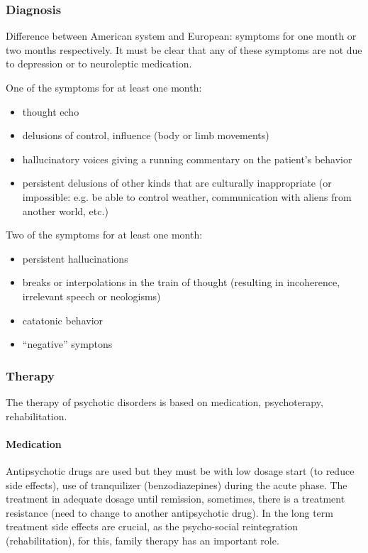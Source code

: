 \documentclass[12pt,article,oneside,a4paper]{memoir}
\begin{document}
\subsubsection{Diagnosis}
Difference between American system and European: symptoms for one month or two
months respectively. It must be clear that any of these symptoms are not due to
depression or to neuroleptic medication.

One of the symptoms for at least one month:
\begin{itemize}
\item thought echo
\item delusions of control, influence (body or limb movements)
\item hallucinatory voices giving a running commentary on the patient's
behavior
\item persistent delusions of other kinds that are culturally inappropriate
(or impossible: e.g. be able to control weather, communication with aliens
from  another world, etc.)
\end{itemize}

Two of the symptoms for at least one month:
\begin{itemize}
\item persistent hallucinations
\item breaks or interpolations in the train of thought (resulting in
incoherence, irrelevant speech or neologisms)
\item catatonic behavior
\item ``negative'' symptons
\end{itemize}

\subsubsection{Therapy}
The therapy of psychotic disorders is based on medication, psychoterapy,
rehabilitation.

\paragraph{Medication}
Antipsychotic drugs are used but they must be with low dosage start (to reduce
side effects), use of tranquilizer (benzodiazepines) during the acute phase.
The treatment in adequate dosage until remission, sometimes, there is a
treatment resistance (need to change to another antipsychotic drug).
In the long term treatment side effects are crucial, as the psycho-social
reintegration (rehabilitation), for this, family therapy has an important role.
\end{document}
